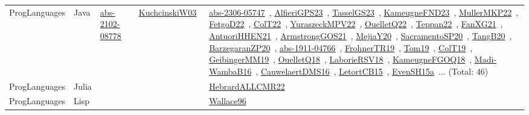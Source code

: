 {\begin{longtable}{lp{3cm}>{\raggedright\arraybackslash}p{6cm}>{\raggedright\arraybackslash}p{6cm}>{\raggedright\arraybackslash}p{8cm}}
ProgLanguages & Java & \href{works/abs-2102-08778.pdf}{abs-2102-08778}~\cite{abs-2102-08778} & \href{works/KuchcinskiW03.pdf}{KuchcinskiW03}~\cite{KuchcinskiW03} & \href{works/abs-2306-05747.pdf}{abs-2306-05747}~\cite{abs-2306-05747}, \href{works/AlfieriGPS23.pdf}{AlfieriGPS23}~\cite{AlfieriGPS23}, \href{works/TasselGS23.pdf}{TasselGS23}~\cite{TasselGS23}, \href{works/KameugneFND23.pdf}{KameugneFND23}~\cite{KameugneFND23}, \href{works/MullerMKP22.pdf}{MullerMKP22}~\cite{MullerMKP22}, \href{works/FetgoD22.pdf}{FetgoD22}~\cite{FetgoD22}, \href{works/ColT22.pdf}{ColT22}~\cite{ColT22}, \href{works/YuraszeckMPV22.pdf}{YuraszeckMPV22}~\cite{YuraszeckMPV22}, \href{works/OuelletQ22.pdf}{OuelletQ22}~\cite{OuelletQ22}, \href{works/Teppan22.pdf}{Teppan22}~\cite{Teppan22}, \href{works/FanXG21.pdf}{FanXG21}~\cite{FanXG21}, \href{works/AntuoriHHEN21.pdf}{AntuoriHHEN21}~\cite{AntuoriHHEN21}, \href{works/ArmstrongGOS21.pdf}{ArmstrongGOS21}~\cite{ArmstrongGOS21}, \href{works/MejiaY20.pdf}{MejiaY20}~\cite{MejiaY20}, \href{works/SacramentoSP20.pdf}{SacramentoSP20}~\cite{SacramentoSP20}, \href{works/TangB20.pdf}{TangB20}~\cite{TangB20}, \href{works/BarzegaranZP20.pdf}{BarzegaranZP20}~\cite{BarzegaranZP20}, \href{works/abs-1911-04766.pdf}{abs-1911-04766}~\cite{abs-1911-04766}, \href{works/FrohnerTR19.pdf}{FrohnerTR19}~\cite{FrohnerTR19}, \href{works/Tom19.pdf}{Tom19}~\cite{Tom19}, \href{works/ColT19.pdf}{ColT19}~\cite{ColT19}, \href{works/GeibingerMM19.pdf}{GeibingerMM19}~\cite{GeibingerMM19}, \href{works/OuelletQ18.pdf}{OuelletQ18}~\cite{OuelletQ18}, \href{works/LaborieRSV18.pdf}{LaborieRSV18}~\cite{LaborieRSV18}, \href{works/KameugneFGOQ18.pdf}{KameugneFGOQ18}~\cite{KameugneFGOQ18}, \href{works/Madi-WambaB16.pdf}{Madi-WambaB16}~\cite{Madi-WambaB16}, \href{works/CauwelaertDMS16.pdf}{CauwelaertDMS16}~\cite{CauwelaertDMS16}, \href{works/LetortCB15.pdf}{LetortCB15}~\cite{LetortCB15}, \href{works/EvenSH15a.pdf}{EvenSH15a}~\cite{EvenSH15a}... (Total: 46)\\
ProgLanguages & Julia &  &  & \href{works/HebrardALLCMR22.pdf}{HebrardALLCMR22}~\cite{HebrardALLCMR22}\\
ProgLanguages & Lisp &  &  & \href{works/Wallace96.pdf}{Wallace96}~\cite{Wallace96}\\

\end{longtable}}
